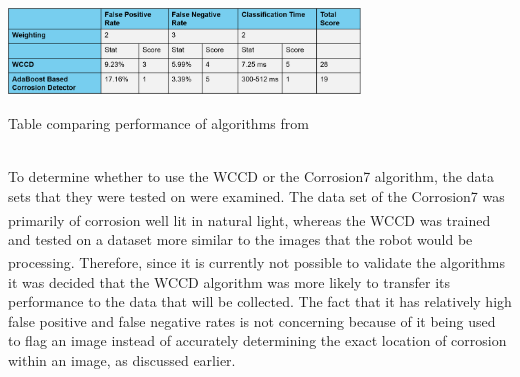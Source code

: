 \documentclass[11pt]{article}		%
\newcommand{\supercite}[1]{\textsuperscript{\cite{#1}}}		%
\begin{document}
			\begin{table}[h]
				\centering
				\includegraphics[width=0.7\textwidth]{WCCD_corrosion_table}
				\caption{Table comparing performance of algorithms from \cite{WCCD}}
				\label{WCCD_comparison}
			\end{table}
		\\
        \hspace*{3ex}To determine whether to use the WCCD or the Corrosion7 algorithm, the data sets that they were tested on were examined. The data set of the Corrosion7 was primarily of corrosion well lit in natural light\supercite{Corrosion7}, whereas the WCCD was trained and tested on a dataset more similar to the images that the robot would be processing.\supercite{WCCD} Therefore, since it is currently not possible to validate the algorithms it was decided that the WCCD algorithm was more likely to transfer its performance to the data that will be collected. The fact that it has relatively high false positive and false negative rates is not concerning because of it being used to flag an image instead of accurately determining the exact location of corrosion within an image, as discussed earlier.
\end{document}
